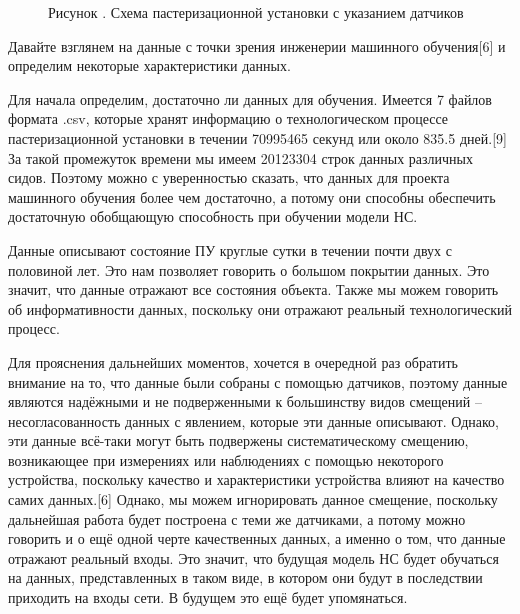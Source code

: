{  \begin{figure}
    \centering
    \def\svgwidth{\textwidth}
    
    \caption*{\gostFont Рисунок \thechaptercntr .\theimagecntr \spc {--} Схема пастеризационной установки с указанием датчиков}
    \label{fig:NNBlackBox}
  \end{figure} \addtocounter{imagecntr}{1} \addtocounter{tablecntr}{1}

  \par \redline Давайте взглянем на данные с точки зрения инженерии машинного обучения[6] и определим некоторые характеристики данных. 

  \par \redline Для начала определим, достаточно ли данных для обучения. Имеется 7 файлов формата .csv, которые хранят информацию о технологическом процессе пастеризационной установки в течении 70995465 секунд или около 835.5 дней.[9] За такой промежуток времени мы имеем 20123304 строк данных различных сидов. Поэтому можно с уверенностью сказать, что данных для проекта машинного обучения более чем достаточно, а потому они способны обеспечить достаточную обобщающую способность при обучении модели НС.

  \par \redline Данные описывают состояние ПУ круглые сутки в течении почти двух с половиной лет. Это нам позволяет говорить о большом покрытии данных. Это значит, что данные отражают все состояния объекта. Также мы можем говорить об информативности данных, поскольку они отражают реальный технологический процесс.

  \par \redline Для прояснения дальнейших моментов, хочется в очередной раз обратить внимание на то, что данные были собраны с помощью датчиков, поэтому данные являются надёжными и не подверженными к большинству видов смещений {--} несогласованность данных с явлением, которые эти данные описывают.  Однако, эти данные всё-таки могут быть подвержены систематическому смещению, возникающее при измерениях или наблюдениях с помощью некоторого устройства, поскольку качество и характеристики устройства влияют на качество самих данных.[6] Однако, мы можем игнорировать данное смещение, поскольку дальнейшая работа будет построена с теми же датчиками, а потому можно говорить и о ещё одной черте качественных данных, а именно о том, что данные отражают реальный входы. Это значит, что будущая модель НС будет обучаться на данных, представленных в таком виде, в котором они будут в последствии приходить на входы сети. В будущем это ещё будет упомянаться.

}
